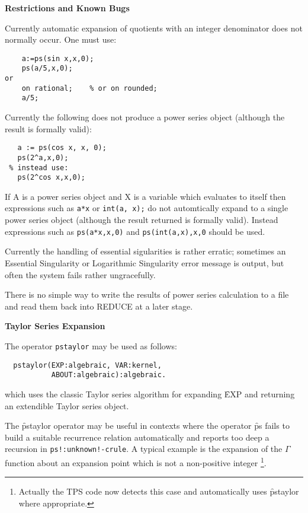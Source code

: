 \textbf{Restrictions and Known Bugs}

Currently automatic expansion of quotients with an integer denominator does not
normally occur. One must use:
\begin{verbatim}
    a:=ps(sin x,x,0);
    ps(a/5,x,0);
or
    on rational;    % or on rounded;
    a/5;
\end{verbatim}

Currently the following does not produce a power series object (although the
result is formally valid):
\begin{verbatim}
   a := ps(cos x, x, 0);
   ps(2^a,x,0);
 % instead use:
   ps(2^cos x,x,0);
\end{verbatim}

If A is a power series object and X is a variable
which evaluates to itself then expressions such as \texttt{a*x} or
\texttt{int(a, x);}  do not automtically expand to a single power series object
(although the result returned is formally valid).  Instead expressions such as
 \texttt{ps(a*x,x,0)} and \texttt{ps(int(a,x),x,0} should be used.

Currently the handling of essential sigularities is rather erratic; sometimes
an Essential Singularity or Logarithmic Singularity error message is output,
but often the system fails rather ungracefully.

There is no simple way to write the results of power series
calculation to a file and read them back into REDUCE at a later
stage.

\textbf{Taylor Series Expansion}

The operator \texttt{pstaylor} may be used as follows:
\hypertarget{operator:PSTAYLOR}{}
\begin{verbatim}
  pstaylor(EXP:algebraic, VAR:kernel, 
           ABOUT:algebraic):algebraic.
\end{verbatim}

which uses the classic Taylor series algorithm for expanding \f{EXP} and
returning an extendible Taylor series object.

The \f{pstaylor} operator may be useful in contexts where the  operator \f{ps}
fails to build a suitable recurrence relation automatically and reports too
deep a recursion in \texttt{ps!:unknown!-crule}. A typical example is the
expansion of the $\Gamma$ function about an expansion point which is not a
non-positive integer
\footnote{Actually the TPS code now detects this case and automatically uses
\f{pstaylor} where appropriate.}.

